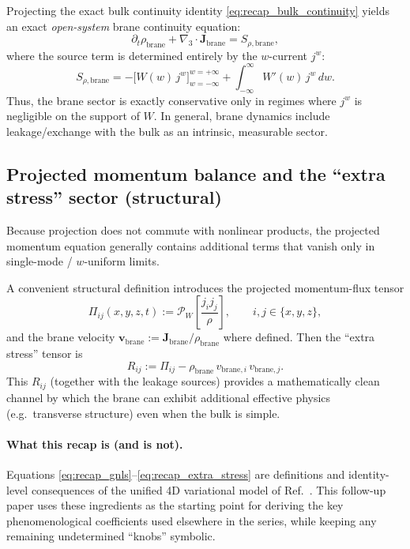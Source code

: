 \documentclass[11pt]{article}
\begin{document}
Projecting the exact bulk continuity identity \eqref{eq:recap_bulk_continuity} yields an exact \emph{open-system} brane continuity equation:
\begin{equation}
\boxed{
\partial_t\rho_{\mathrm{brane}} + \nabla_3\cdot \mathbf{J}_{\mathrm{brane}}
=
S_{\rho,\mathrm{brane}},
}
\label{eq:recap_brane_continuity}
\end{equation}
where the source term is determined entirely by the $w$-current $j^w$:
\begin{equation}
\boxed{
S_{\rho,\mathrm{brane}}
=
-\Big[W(w)\,j^w\Big]_{w=-\infty}^{w=+\infty}
+\int_{-\infty}^{\infty} W'(w)\,j^w\,dw.
}
\label{eq:recap_leakage_source}
\end{equation}
Thus, the brane sector is exactly conservative only in regimes where $j^w$ is negligible on the support of $W$.
In general, brane dynamics include leakage/exchange with the bulk as an intrinsic, measurable sector.

\subsection{Projected momentum balance and the ``extra stress'' sector (structural)}
\label{sec:recap_brane_momentum}

Because projection does not commute with nonlinear products, the projected momentum equation generally contains
additional terms that vanish only in single-mode / $w$-uniform limits.

A convenient structural definition introduces the projected momentum-flux tensor
\begin{equation}
\Pi_{ij}(x,y,z,t) := \mathcal{P}_W\!\left[\frac{j_i j_j}{\rho}\right],\qquad i,j\in\{x,y,z\},
\end{equation}
and the brane velocity $\mathbf{v}_{\mathrm{brane}}:=\mathbf{J}_{\mathrm{brane}}/\rho_{\mathrm{brane}}$ where defined.
Then the ``extra stress'' tensor is
\begin{equation}
\boxed{
R_{ij} := \Pi_{ij} - \rho_{\mathrm{brane}}\,v_{\mathrm{brane},i}\,v_{\mathrm{brane},j}.
}
\label{eq:recap_extra_stress}
\end{equation}
This $R_{ij}$ (together with the leakage sources) provides a mathematically clean channel by which
the brane can exhibit additional effective physics (e.g.\ transverse structure) even when the bulk is simple.

\paragraph{What this recap is (and is not).}
Equations \eqref{eq:recap_gnls}--\eqref{eq:recap_extra_stress} are definitions and identity-level consequences
of the unified 4D variational model of Ref.~\cite{norris2026_4d_model}. This follow-up paper uses these ingredients as the starting point
for deriving the key phenomenological coefficients used elsewhere in the series, while keeping any remaining undetermined
``knobs'' symbolic.
\end{document}
